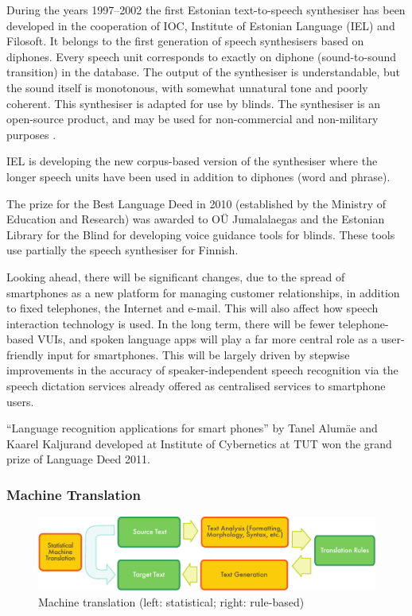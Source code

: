 \begin{multicols}{2}
During the years 1997--2002 the first Estonian text-to-speech synthesiser has been developed in the cooperation of IOC, Institute of Estonian Language (IEL) and Filosoft.  It belongs to the first generation of speech synthesisers based on diphones.  Every speech unit corresponds to exactly on diphone (sound-to-sound transition) in the database.  The output of the synthesiser is understandable, but the sound itself is monotonous, with somewhat unnatural tone and poorly coherent.  This synthesiser is adapted for use by blinds.  The synthesiser is an open-source product, and may be used for non-commercial and non-military purposes \cite{IEL}.

IEL is developing the new corpus-based version of the synthesiser where the longer speech units have been used in addition to diphones (word and phrase).

The prize for the Best Language Deed in 2010 (established by the Ministry of Education and Research) was awarded to OÜ Jumalalaegas and the Estonian Library for the Blind for developing voice guidance tools for blinds.  These tools use partially the speech synthesiser for Finnish.

Looking ahead, there will be significant changes, due to the spread of smartphones as a new platform for managing customer relationships, in addition to fixed telephones, the Internet and e-mail. This will also affect how speech interaction technology is used. In the long term, there will be fewer telephone-based VUIs, and spoken language apps will play a far more central role as a user-friendly input for smartphones. This will be largely driven by stepwise improvements in the accuracy of speaker-independent speech recognition via the speech dictation services already offered as centralised services to smartphone users. 

``Language recognition applications for smart phones'' by Tanel Alumäe and Kaarel Kaljurand developed at Institute of Cybernetics at TUT won the grand prize of Language Deed 2011.

\subsubsection{Machine Translation}

\begin{figure}[htb]
  \center
  \includegraphics[width=\textwidth]{../_media/english/machine_translation}
  \caption{Machine translation (left: statistical; right: rule-based)}
  \label{fig:mtarch_en}
\end{figure}


\end{multicols}
